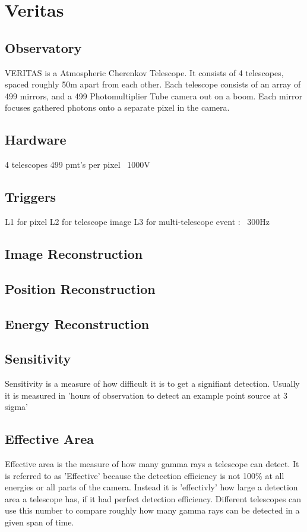 \cleartooddpage[\thispagestyle{empty}]
\chapter{Veritas}

\section{Observatory}

VERITAS is a Atmospheric Cherenkov Telescope.
It consists of 4 telescopes, spaced roughly 50m apart from each other.
Each telescope consists of an array of 499 mirrors, and a 499 Photomultiplier Tube camera out on a boom.
Each mirror focuses gathered photons onto a separate pixel in the camera.


\section{Hardware}

4 telescopes
499 pmt's per pixel
~1000V

\section{Triggers}
L1 for pixel
L2 for telescope image
L3 for multi-telescope event : ~300Hz

\section{Image Reconstruction}

\section{Position Reconstruction}

\section{Energy Reconstruction}

\section{Sensitivity}
Sensitivity is a measure of how difficult it is to get a signifiant detection.
Usually it is measured in 'hours of observation to detect an example point source at 3 sigma'

\section{Effective Area}
Effective area is the measure of how many gamma rays a telescope can detect.
It is referred to as 'Effective' because the detection efficiency is not 100\% at all energies or all parts of the camera.
Instead it is 'effectivly' how large a detection area a telescope has, if it had perfect detection efficiency.
Different telescopes can use this number to compare roughly how many gamma rays can be detected in a given span of time.

